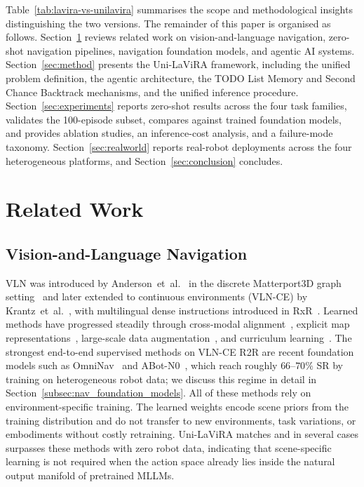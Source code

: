 \documentclass[conference]{IEEEtran}
\newcommand{\ourmethod}{Uni-LaViRA\xspace}
\begin{document}
Table~\ref{tab:lavira-vs-unilavira} summarises the scope and methodological
insights distinguishing the two versions. The remainder of this paper is
organised as follows. Section~\ref{sec:related} reviews related work on
vision-and-language navigation, zero-shot navigation pipelines, navigation
foundation models, and agentic AI systems. Section~\ref{sec:method} presents
the \ourmethod framework, including the unified problem definition, the
agentic architecture, the TODO List Memory and Second Chance Backtrack
mechanisms, and the unified inference procedure. Section~\ref{sec:experiments}
reports zero-shot results across the four task families, validates the
100-episode subset, compares against trained foundation models, and provides
ablation studies, an inference-cost analysis, and a failure-mode taxonomy.
Section~\ref{sec:realworld} reports real-robot deployments across the four
heterogeneous platforms, and Section~\ref{sec:conclusion} concludes.

\section{Related Work}
\label{sec:related}

\subsection{Vision-and-Language Navigation}

VLN was introduced by Anderson~et~al.~\cite{anderson2018vision} in the
discrete Matterport3D graph setting~\cite{chang2017matterport3d} and later
extended to continuous environments (VLN-CE) by
Krantz~et~al.~\cite{krantz2020beyond}, with multilingual dense instructions
introduced in RxR~\cite{ku2020rxr}. Learned methods have progressed steadily
through cross-modal alignment~\cite{hong2021vlnbert,chen2022duet}, explicit
map representations~\cite{wang2023gridmm,an2023bevbert, an2024etpnav},
large-scale data augmentation~\cite{wang2023scalevln}, and curriculum
learning~\cite{zhu2020babywalk}. The strongest end-to-end supervised methods on VLN-CE R2R are recent
foundation models such as OmniNav~\cite{xue2025omninav} and
ABot-N0~\cite{chen2026abotn0}, which reach roughly $66$--$70\%$ SR by training
on heterogeneous robot data; we discuss this regime in detail in
Section~\ref{subsec:nav_foundation_models}. All of these methods rely on
environment-specific training. The learned weights encode scene priors from
the training distribution and do not transfer to new environments, task
variations, or embodiments without costly retraining. \ourmethod matches and
in several cases surpasses these methods with zero robot data, indicating that
scene-specific learning is not required when the action space already lies
inside the natural output manifold of pretrained MLLMs.
\end{document}
